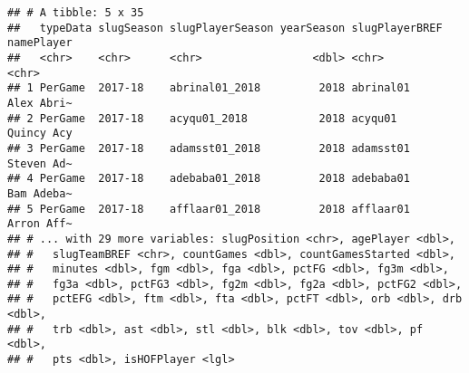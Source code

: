 \documentclass[]{article}
\newenvironment{Shaded}{\begin{snugshade}}{\end{snugshade}}
\newcommand{\KeywordTok}[1]{\textcolor[rgb]{0.13,0.29,0.53}{\textbf{#1}}}
\newcommand{\DataTypeTok}[1]{\textcolor[rgb]{0.13,0.29,0.53}{#1}}
\newcommand{\DecValTok}[1]{\textcolor[rgb]{0.00,0.00,0.81}{#1}}
\newcommand{\StringTok}[1]{\textcolor[rgb]{0.31,0.60,0.02}{#1}}
\newcommand{\OperatorTok}[1]{\textcolor[rgb]{0.81,0.36,0.00}{\textbf{#1}}}
\newcommand{\NormalTok}[1]{#1}
\begin{document}
\begin{Shaded}
\end{Shaded}

\begin{verbatim}
## # A tibble: 5 x 35
##   typeData slugSeason slugPlayerSeason yearSeason slugPlayerBREF namePlayer
##   <chr>    <chr>      <chr>                 <dbl> <chr>          <chr>     
## 1 PerGame  2017-18    abrinal01_2018         2018 abrinal01      Alex Abri~
## 2 PerGame  2017-18    acyqu01_2018           2018 acyqu01        Quincy Acy
## 3 PerGame  2017-18    adamsst01_2018         2018 adamsst01      Steven Ad~
## 4 PerGame  2017-18    adebaba01_2018         2018 adebaba01      Bam Adeba~
## 5 PerGame  2017-18    afflaar01_2018         2018 afflaar01      Arron Aff~
## # ... with 29 more variables: slugPosition <chr>, agePlayer <dbl>,
## #   slugTeamBREF <chr>, countGames <dbl>, countGamesStarted <dbl>,
## #   minutes <dbl>, fgm <dbl>, fga <dbl>, pctFG <dbl>, fg3m <dbl>,
## #   fg3a <dbl>, pctFG3 <dbl>, fg2m <dbl>, fg2a <dbl>, pctFG2 <dbl>,
## #   pctEFG <dbl>, ftm <dbl>, fta <dbl>, pctFT <dbl>, orb <dbl>, drb <dbl>,
## #   trb <dbl>, ast <dbl>, stl <dbl>, blk <dbl>, tov <dbl>, pf <dbl>,
## #   pts <dbl>, isHOFPlayer <lgl>
\end{verbatim}

\begin{Shaded}
\end{Shaded}
\end{document}
